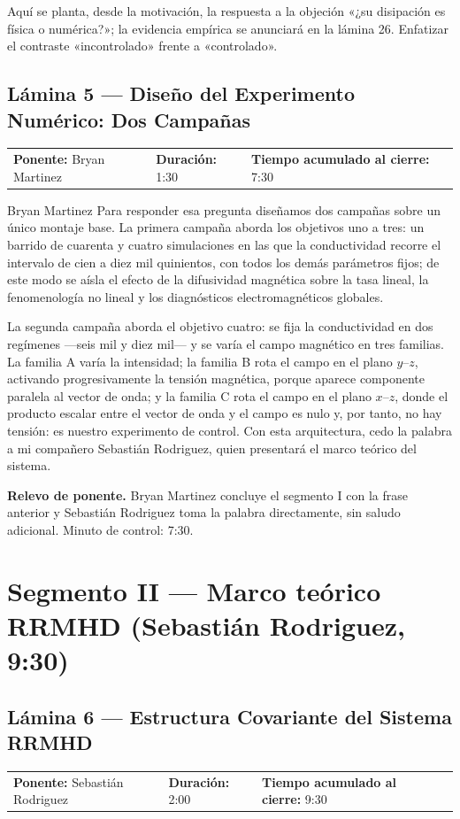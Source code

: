 \documentclass[11pt,letterpaper]{article}
\makeatletter
\newcommand{\lamina}[5]{%
  \subsection*{Lámina #1 --- #2}
  \noindent
  \begin{tabular}{@{}llll@{}}
    \textbf{Ponente:} #3 &\quad \textbf{Duración:} #4 &\quad
    \textbf{Tiempo acumulado al cierre:} #5 &
  \end{tabular}
  \vspace{2pt}}
\newcommand{\relevo}[1]{%
  \begin{center}
  \begin{tcolorbox}[colback=gold!20,colframe=gold!80!black,boxrule=0.6pt,
    width=0.92\linewidth,arc=1.5pt,left=6pt,right=6pt,top=4pt,bottom=4pt]
    \small\textbf{Relevo de ponente.} #1
  \end{tcolorbox}
  \end{center}}
\makeatother
\begin{document}
\begin{indicaciones}
Aquí se planta, desde la motivación, la respuesta a la objeción «¿su
disipación es física o numérica?»; la evidencia empírica se anunciará en la
lámina 26. Enfatizar el contraste «incontrolado» frente a «controlado».
\end{indicaciones}

\lamina{5}{Diseño del Experimento Numérico: Dos Campañas}{Bryan Martinez}{1:30}{7:30}

\begin{parlamento}{Bryan Martinez}
Para responder esa pregunta diseñamos dos campañas sobre un único montaje
base. La primera campaña aborda los objetivos uno a tres: un barrido de
cuarenta y cuatro simulaciones en las que la conductividad recorre el
intervalo de cien a diez mil quinientos, con todos los demás parámetros
fijos; de este modo se aísla el efecto de la difusividad magnética sobre la
tasa lineal, la fenomenología no lineal y los diagnósticos
electromagnéticos globales.

La segunda campaña aborda el objetivo cuatro: se fija la conductividad en dos
regímenes ---seis mil y diez mil--- y se varía el campo magnético en tres
familias. La familia A varía la intensidad; la familia B rota el campo en el
plano $y$--$z$, activando progresivamente la tensión magnética, porque
aparece componente paralela al vector de onda; y la familia C rota el campo
en el plano $x$--$z$, donde el producto escalar entre el vector de onda y el
campo es nulo y, por tanto, no hay tensión: es nuestro experimento de
control. Con esta arquitectura, cedo la palabra a mi compañero Sebastián
Rodriguez, quien presentará el marco teórico del sistema.
\end{parlamento}

\relevo{Bryan Martinez concluye el segmento I con la frase anterior y
Sebastián Rodriguez toma la palabra directamente, sin saludo adicional.
Minuto de control: 7:30.}

\section{Segmento II --- Marco teórico RRMHD (Sebastián Rodriguez, 9:30)}

\lamina{6}{Estructura Covariante del Sistema RRMHD}{Sebastián Rodriguez}{2:00}{9:30}
\end{document}
